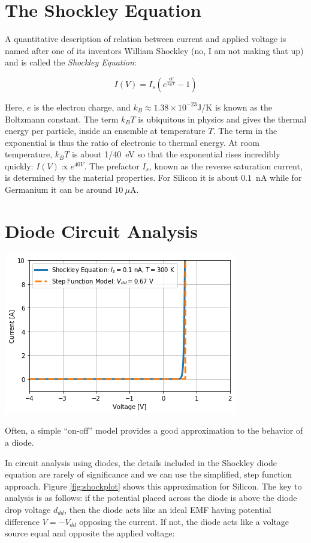 \documentclass{tufte-book}
\begin{document}
\section{The Shockley Equation}
A quantitative description of relation between current and applied voltage is named after one of its inventors William Shockley (no, I am not making that up) and is called the \textit{Shockley Equation}:

\begin{equation}
\label{eq:schockley}
I(V) = I_s\left(e^\frac{eV}{k_BT}-1\right)
\end{equation}

Here, $e$ is the electron charge, and $k_B \approx 1.38\times10^{-23}$J/K is known as the Boltzmann constant. The term $k_BT$ is ubiquitous in physics and gives the thermal energy per particle, inside an ensemble at temperature $T$. The term in the  exponential is thus the ratio of electronic to thermal energy. At room temperature, $k_BT$ is about 1/40~eV so that the exponential rises incredibly quickly: $I(V) \propto e^{40V}$. The prefactor $I_s$, known as the reverse saturation current, is determined by the material properties. For Silicon it is about $0.1$~nA while for Germanium it can be around $10~\mu$A.


\section{Diode Circuit Analysis}
\begin{marginfigure}%
  \includegraphics[]{shockley_approx}
  \caption{Often, a simple ``on-off'' model provides a good approximation to the behavior of a diode.}
  \label{fig:shockplot}
\end{marginfigure}


In circuit analysis using diodes, the details included in the Shockley diode equation are rarely of significance and we can use the simplified, step function approach. Figure \ref{fig:shockplot} shows this approximation for Silicon. The key to analysis is as follows: if the potential placed across the diode is above the diode drop voltage $d_{dd}$, then the diode acts like an ideal EMF having potential difference $V = -V_{dd}$ opposing the current. If not, the diode acts like a voltage source equal and opposite the applied voltage:
\end{document}
